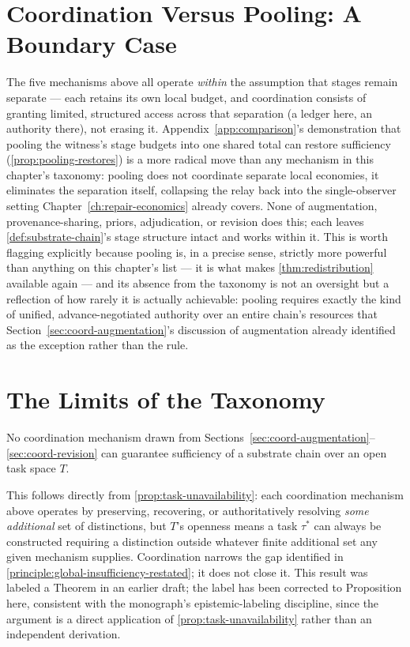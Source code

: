\section{Coordination Versus Pooling: A Boundary Case}
\label{sec:coord-vs-pooling}

The five mechanisms above all operate \emph{within} the assumption that
stages remain separate --- each retains its own local budget, and
coordination consists of granting limited, structured access across that
separation (a ledger here, an authority there), not erasing it.
Appendix~\ref{app:comparison}'s demonstration that pooling the witness's
stage budgets into one shared total can restore sufficiency
(\cref{prop:pooling-restores}) is a more radical move than any mechanism
in this chapter's taxonomy: pooling does not coordinate separate local
economies, it eliminates the separation itself, collapsing the relay back
into the single-observer setting Chapter~\ref{ch:repair-economics}
already covers. None of augmentation, provenance-sharing, priors,
adjudication, or revision does this; each leaves
\cref{def:substrate-chain}'s stage structure intact and works within it.
This is worth flagging explicitly because pooling is, in a precise sense,
strictly more powerful than anything on this chapter's list --- it is
what makes \cref{thm:redistribution} available again --- and its absence
from the taxonomy is not an oversight but a reflection of how rarely it
is actually achievable: pooling requires exactly the kind of unified,
advance-negotiated authority over an entire chain's resources that
Section~\ref{sec:coord-augmentation}'s discussion of augmentation already
identified as the exception rather than the rule.

\section{The Limits of the Taxonomy}

\begin{proposition}
\label{prop:no-coordination-universal}
No coordination mechanism drawn from
Sections~\ref{sec:coord-augmentation}--\ref{sec:coord-revision} can
guarantee sufficiency of a substrate chain over an open task space $T$.
\end{proposition}

\begin{proofsketch}
This follows directly from \cref{prop:task-unavailability}: each
coordination mechanism above operates by preserving, recovering, or
authoritatively resolving \emph{some additional} set of distinctions, but
$T$'s openness means a task $\tau^*$ can always be constructed requiring a
distinction outside whatever finite additional set any given mechanism
supplies. Coordination narrows the gap identified in
\cref{principle:global-insufficiency-restated}; it does not close it. This
result was labeled a Theorem in an earlier draft; the label has been
corrected to Proposition here, consistent with the monograph's
epistemic-labeling discipline, since the argument is a direct application
of \cref{prop:task-unavailability} rather than an independent derivation.
\end{proofsketch}

